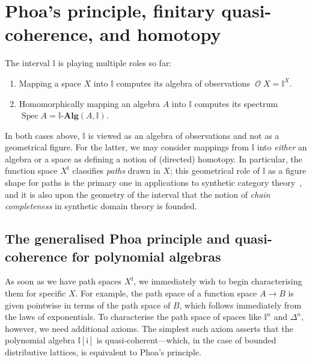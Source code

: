 \documentclass[a4paper,12pt]{amsart}
\newtheorem{corollary}[theorem]{Corollary}
\theoremstyle{definition}
\newcommand{\mc}[1]{\mathcal{#1}}
\newcommand{\mb}[1]{\mathbf{#1}}
\newcommand{\mbb}[1]{\mathbb{#1}}
\newcommand{\I}{\mbb I}
\newcommand{\ms}[1]{\mathsf{#1}}
\newcommand{\alg}{\text{-}\mb{Alg}}
\newcommand{\spec}{\operatorname{Spec}}
\newcommand{\opens}{\operatorname{\mc{O}}} %
\begin{document}


\section{Phoa's principle, finitary quasi-coherence, and homotopy}

The interval $\I$ is playing multiple roles so far:
\begin{enumerate}
  \item Mapping a space $X$ into $\I$ computes its algebra of observations $\opens{X} = \I^X$.
  \item Homomorphically mapping an algebra $A$ into $\I$ computes its spectrum $\spec{A} = \I\alg(A,\I)$.
\end{enumerate}

In both cases above, $\I$ is viewed as an algebra of observations and not as a geometrical figure. For the latter, we may consider mappings from $\I$ into \emph{either} an algebra or a space as defining a notion of (directed) homotopy. In particular, the function space $X^\I$ classifies \emph{paths} drawn in $X$; this geometrical role of $\I$ as a figure shape for paths is the primary one in applications to synthetic category theory~\citep{riehl2017type}, and it is also upon the geometry of the interval that the notion of \emph{chain completeness} in synthetic domain theory is founded.

\subsection{The generalised Phoa principle and quasi-coherence for polynomial algebras}

As soon as we have path spaces $X^\I$, we immediately wish to begin characterising them for specific $X$. For example, the path space of a function space $A\to B$ is given pointwise in terms of the path space of $B$, which follows immediately from the laws of exponentials. To characterise the path space of spaces like $\I^n$ and $\Delta^n$, however, we need additional axioms. The simplest such axiom asserts that the polynomial algebra $\I[\ms{i}]$ is quasi-coherent—which, in the case of bounded distributive lattices, is equivalent to Phoa's principle.
\end{document}
